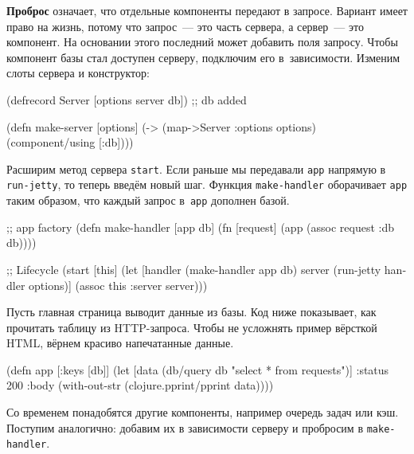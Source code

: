 
\textbf{Проброс} означает, что отдельные компоненты передают в запросе. Вариант
имеет право на жизнь, потому что запрос~--- это часть сервера, а сервер~--- это
компонент. На основании этого последний может добавить поля запросу. Чтобы компонент
базы стал доступен серверу, подключим его в~зависимости. Изменим слоты сервера и
конструктор:

\begin{english}
  \begin{clojure}
(defrecord Server
  [options server db]) ;; db added

(defn make-server
  [options]
  (-> (map->Server {:options options})
      (component/using [:db])))
  \end{clojure}
\end{english}

Расширим метод сервера \verb|start|. Если раньше мы передавали \verb|app|
напрямую в \verb|run-jetty|, то теперь введём новый шаг. Функция
\verb|make-handler| оборачивает \verb|app| таким образом, что каждый запрос
в~\verb|app| дополнен базой.

\begin{english}
  \begin{clojure}
;; app factory
(defn make-handler [app db]
  (fn [request]
    (app (assoc request :db db))))

;; Lifecycle
(start [this]
  (let [handler (make-handler app db)
        server (run-jetty handler options)]
    (assoc this :server server)))
  \end{clojure}
\end{english}

Пусть главная страница выводит данные из базы. Код ниже показывает, как
прочитать таблицу из HTTP-запроса. Чтобы не усложнять пример вёрсткой HTML,
вёрнем красиво напечатанные данные.

\begin{english}
  \begin{clojure}
(defn app [{:keys [db]}]
  (let [data (db/query db "select * from requests")]
    {:status 200
     :body (with-out-str
             (clojure.pprint/pprint data))}))
  \end{clojure}
\end{english}

Со временем понадобятся другие компоненты, например очередь задач или
кэш. Поступим аналогично: добавим их в зависимости серверу и пробросим в
\verb|make-handler|.


